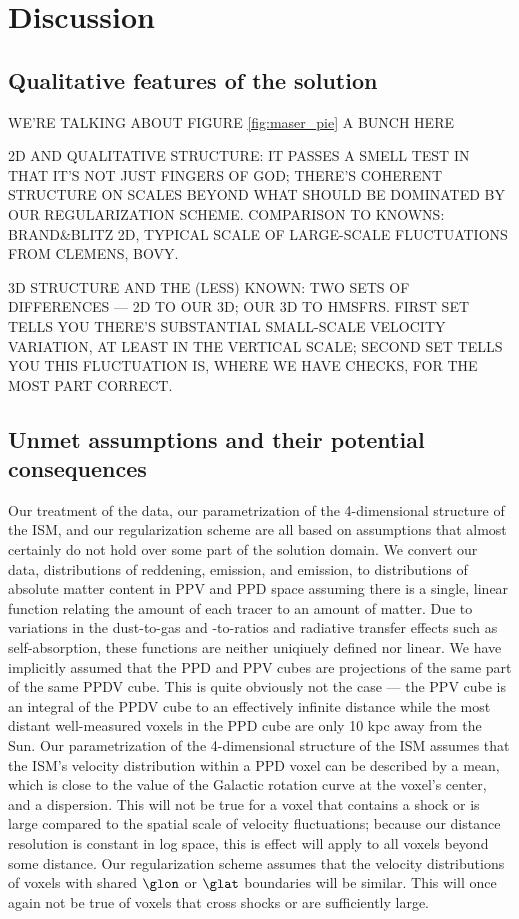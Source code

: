 \section{Discussion}
\label{sec:discussion}
\subsection{Qualitative features of the solution}
\label{sec:discussion-qualitative}
WE'RE TALKING ABOUT FIGURE \ref{fig:maser_pie} A BUNCH HERE

2D AND QUALITATIVE STRUCTURE: IT PASSES A SMELL TEST IN THAT IT'S NOT JUST FINGERS OF GOD; THERE'S COHERENT STRUCTURE ON SCALES BEYOND WHAT SHOULD BE DOMINATED BY OUR REGULARIZATION SCHEME. COMPARISON TO KNOWNS: BRAND&BLITZ 2D, TYPICAL SCALE OF LARGE-SCALE FLUCTUATIONS FROM CLEMENS, BOVY.

3D STRUCTURE AND THE (LESS) KNOWN: TWO SETS OF DIFFERENCES --- 2D TO OUR 3D; OUR 3D TO HMSFRS. FIRST SET TELLS YOU THERE'S SUBSTANTIAL SMALL-SCALE VELOCITY VARIATION, AT LEAST IN THE VERTICAL SCALE; SECOND SET TELLS YOU THIS FLUCTUATION IS, WHERE WE HAVE CHECKS, FOR THE MOST PART CORRECT. 

\subsection{Unmet assumptions and their potential consequences}
\label{sec:discussion-systematics}
Our treatment of the data, our parametrization of the 4-dimensional structure of the ISM, and our regularization scheme are all based on assumptions that almost certainly do not hold over some part of the solution domain. 
We convert our data, distributions of reddening, \atomH{} emission, and \CO emission, to distributions of absolute matter content in PPV and PPD space assuming there is a single, linear function relating the amount of each tracer to an amount of matter.
Due to variations in the dust-to-gas and \CO-to-\molH ratios and radiative transfer effects such as self-absorption, these functions are neither uniqiuely defined nor linear. 
We have implicitly assumed that the PPD and PPV cubes are projections of the same part of the same PPDV cube. 
This is quite obviously not the case --- the PPV cube is an integral of the PPDV cube to an effectively infinite distance while the most distant well-measured voxels in the PPD cube are only 10 kpc away from the Sun.
Our parametrization of the 4-dimensional structure of the ISM assumes that the ISM's velocity distribution within a PPD voxel can be described by a mean, which is close to the value of the Galactic rotation curve at the voxel's center, and a dispersion.  
This will not be true for a voxel that contains a shock or is large compared to the spatial scale of velocity fluctuations; because our distance resolution is constant in log space, this is effect will apply to all voxels beyond some distance. 
Our regularization scheme assumes that the velocity distributions of voxels with shared $\glon$ or $\glat$ boundaries will be similar. 
This will once again not be true of voxels that cross shocks or are sufficiently large. 

